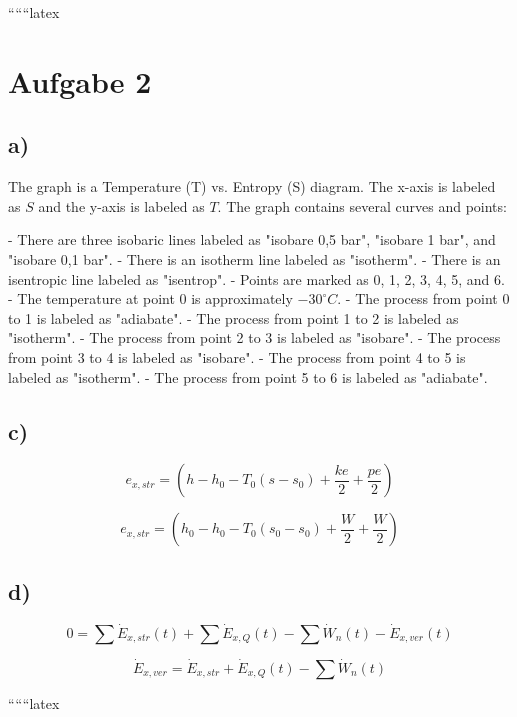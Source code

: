 
``````latex


\section*{Aufgabe 2}

\subsection*{a)}

The graph is a Temperature (T) vs. Entropy (S) diagram. The x-axis is labeled as $S$ and the y-axis is labeled as $T$. The graph contains several curves and points:

- There are three isobaric lines labeled as "isobare 0,5 bar", "isobare 1 bar", and "isobare 0,1 bar".
- There is an isotherm line labeled as "isotherm".
- There is an isentropic line labeled as "isentrop".
- Points are marked as 0, 1, 2, 3, 4, 5, and 6.
- The temperature at point 0 is approximately $-30^\circ C$.
- The process from point 0 to 1 is labeled as "adiabate".
- The process from point 1 to 2 is labeled as "isotherm".
- The process from point 2 to 3 is labeled as "isobare".
- The process from point 3 to 4 is labeled as "isobare".
- The process from point 4 to 5 is labeled as "isotherm".
- The process from point 5 to 6 is labeled as "adiabate".

\subsection*{c)}

\[
e_{x,str} = \left( h - h_0 - T_0 (s - s_0) + \frac{ke}{2} + \frac{pe}{2} \right)
\]

\[
e_{x,str} = \left( h_0 - h_0 - T_0 (s_0 - s_0) + \frac{W}{2} + \frac{W}{2} \right)
\]

\subsection*{d)}

\[
0 = \sum \dot{E}_{x,str}(t) + \sum \dot{E}_{x,Q}(t) - \sum \dot{W}_n(t) - \dot{E}_{x,ver}(t)
\]

\[
\dot{E}_{x,ver} = \dot{E}_{x,str} + \dot{E}_{x,Q}(t) - \sum \dot{W}_n(t)
\]

``````latex


